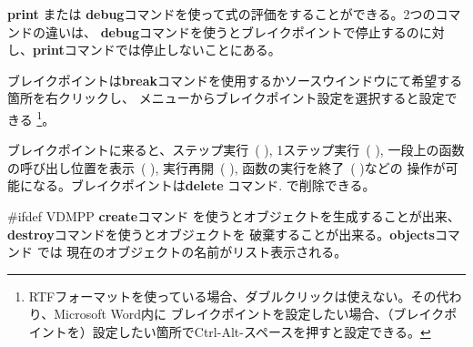 \documentclass[\pformat,12pt]{article}
\newcommand{\guicmd}[1]{{\sf #1}}
\newcommand{\guicmd}[1]{{\gt #1}}
\begin{document}
\textbf{print} または
\textbf{debug}コマンドを使って式の評価をすることができる。2つのコマンドの違いは、
{\bf debug}コマンドを使うとブレイクポイントで停止するのに対し、{\bf print}コマンドでは停止しないことにある。

ブレイクポイントは\textbf{break}コマンドを使用するか\guicmd{ソース}ウインドウにて希望する箇所を右クリックし、
メニューから\guicmd{ブレイクポイント設定}を選択すると設定できる
\footnote{RTFフォーマットを使っている場合、ダブルクリックは使えない。その代わり、Microsoft Word内に
ブレイクポイントを設定したい場合、（ブレイクポイントを）設定したい箇所でCtrl-Alt-スペースを押すと設定できる。}。

ブレイクポイントに来ると、\guicmd{ステップ実行}~(\hspace{-1.8mm}
),
\guicmd{1ステップ実行}~(\hspace{-1.8mm} 
),
\guicmd{一段上の函数の呼び出し位置を表示}~(\hspace{-1.8mm}
),
\guicmd{実行再開}~(\hspace{-1.8mm}
),
\guicmd{函数の実行を終了}~(\hspace{-1.8mm} 
)などの
操作が可能になる。ブレイクポイントは\textbf{delete} コマンド.
で削除できる。

#ifdef VDMPP
\textbf{create}コマンド を使うとオブジェクトを生成することが出来、
\textbf{destroy}コマンドを使うとオブジェクトを
破棄することが出来る。\textbf{objects}コマンド では
現在のオブジェクトの名前がリスト表示される。
\end{document}

